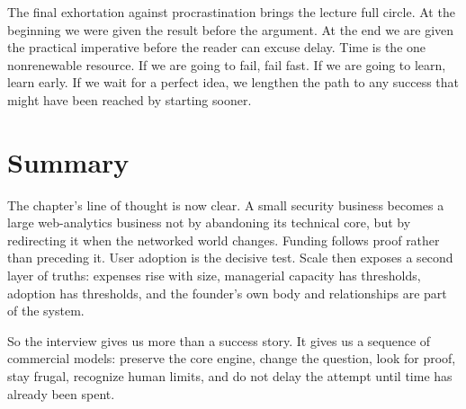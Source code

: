 The final exhortation against procrastination brings the lecture full circle. At the beginning we were given the result before the argument. At the end we are given the practical imperative before the reader can excuse delay. Time is the one nonrenewable resource. If we are going to fail, fail fast. If we are going to learn, learn early. If we wait for a perfect idea, we lengthen the path to any success that might have been reached by starting sooner.

\section{Summary}

The chapter's line of thought is now clear. A small security business becomes a large web-analytics business not by abandoning its technical core, but by redirecting it when the networked world changes. Funding follows proof rather than preceding it. User adoption is the decisive test. Scale then exposes a second layer of truths: expenses rise with size, managerial capacity has thresholds, adoption has thresholds, and the founder's own body and relationships are part of the system.

So the interview gives us more than a success story. It gives us a sequence of commercial models: preserve the core engine, change the question, look for proof, stay frugal, recognize human limits, and do not delay the attempt until time has already been spent.